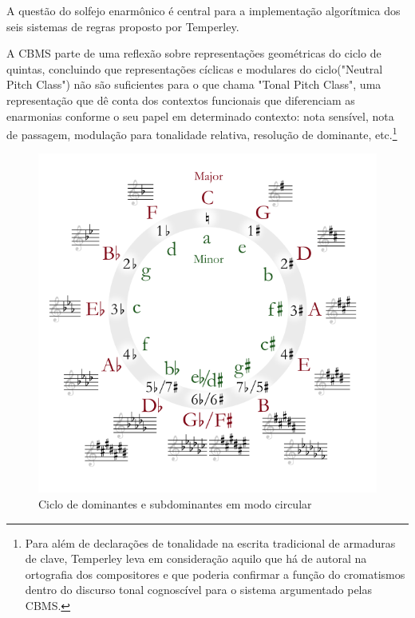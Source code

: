 \documentclass[
	12pt,				%
	openright,			%
	twoside,			%
	a4paper,			%
	english,			%
	french,				%
	spanish,			%
	brazil				%
	]{abntex2}
\begin{document}
A questão do solfejo enarmônico é central para a implementação algorítmica dos seis sistemas de regras proposto por Temperley.

A CBMS parte de uma reflexão sobre representações geométricas do ciclo de quintas, concluindo que representações cíclicas e modulares do ciclo("Neutral Pitch Class") não são suficientes para o que chama "Tonal Pitch Class", uma representação que dê conta dos contextos funcionais que diferenciam as enarmonias conforme o seu papel em determinado contexto: nota sensível, nota de passagem, modulação para tonalidade relativa, resolução de dominante, etc.\footnote{Para além de declarações de tonalidade na escrita tradicional de armaduras de clave, Temperley leva em consideração aquilo que há de autoral na ortografia\cite[p.123]{temperley2004cognition}  dos compositores e que poderia confirmar a função do cromatismos dentro do discurso tonal cognoscível para o sistema argumentado pelas CBMS.}

\begin{figure}[!h]
	\caption{\label{fig_grafico}Ciclo de dominantes e subdominantes em modo circular }
	\begin{center}
	    \includegraphics[scale=0.6]{CBMS/quintas.png}
	\end{center}
\end{figure}
\end{document}
